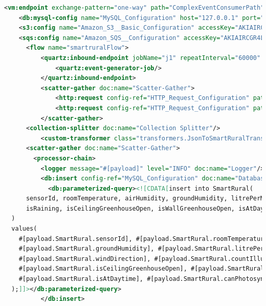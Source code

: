 \documentclass[a4paper,12pt]{article}
\begin{document}
\begin{lstlisting}[language=xml,caption=smart-rural.xml]
    <vm:endpoint exchange-pattern="one-way" path="ComplexEventConsumerPath" name="ComplexEventConsumerGlobalVM" doc:name="VM"/>
    <db:mysql-config name="MySQL_Configuration" host="127.0.0.1" port="3306" user="isi" password="isi" database="smartrural" doc:name="MySQL Configuration"/>
    <s3:config name="Amazon_S3__Basic_Configuration" accessKey="AKIAIRCGR4L5ZHCTWZEA" secretKey="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" doc:name="Amazon S3: Basic Configuration"/>
    <sqs:config name="Amazon_SQS__Configuration" accessKey="AKIAIRCGR4L5ZHCTWZEA" secretKey="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" defaultQueueName="smartrural-isi" doc:name="Amazon SQS: Configuration"/>
      <flow name="smartruralFlow">
          <quartz:inbound-endpoint jobName="j1" repeatInterval="60000" responseTimeout="10000" doc:name="Quartz">
              <quartz:event-generator-job/>
          </quartz:inbound-endpoint>
          <scatter-gather doc:name="Scatter-Gather">
              <http:request config-ref="HTTP_Request_Configuration" path="/channels/1252445/feed.json?results=1" method="GET" doc:name="HTTP Smart Rural 1"/>
              <http:request config-ref="HTTP_Request_Configuration" path="/channels/1252453/feed.json?results=1" method="GET" doc:name="HTTP Smart Rural 2"/>
          </scatter-gather>
      <collection-splitter doc:name="Collection Splitter"/>
          <custom-transformer class="transformers.JsonToSmartRuralTransformer" doc:name="JSON to SmartRural Transformer"/>
      <scatter-gather doc:name="Scatter-Gather">
        <processor-chain>
          <logger message="#[payload]" level="INFO" doc:name="Logger"/>
          <db:insert config-ref="MySQL_Configuration" doc:name="Database">
            <db:parameterized-query><![CDATA[insert into SmartRural(
      sensorId, roomTemperature, airHumidity, groundHumidity, litrePerMeterWater, windForce, windDirection, countIllumination,
      isRaining, isCeilingGreenhouseOpen, isWallGreenhouseOpen, isAtDaytime, canPhotosynthesisImprove
  )
  values(
    #[payload.SmartRural.sensorId], #[payload.SmartRural.roomTemperature], #[payload.SmartRural.airHumidity],
    #[payload.SmartRural.groundHumidity], #[payload.SmartRural.litrePerMeterWater], #[payload.SmartRural.windForce],
    #[payload.SmartRural.windDirection], #[payload.SmartRural.countIllumination], #[payload.SmartRural.isRaining],
    #[payload.SmartRural.isCeilingGreenhouseOpen], #[payload.SmartRural.isWallGreenhouseOpen],
    #[payload.SmartRural.isAtDaytime], #[payload.SmartRural.canPhotosynthesisImprove]
  );]]></db:parameterized-query>
          </db:insert>

\end{lstlisting}
\end{document}
